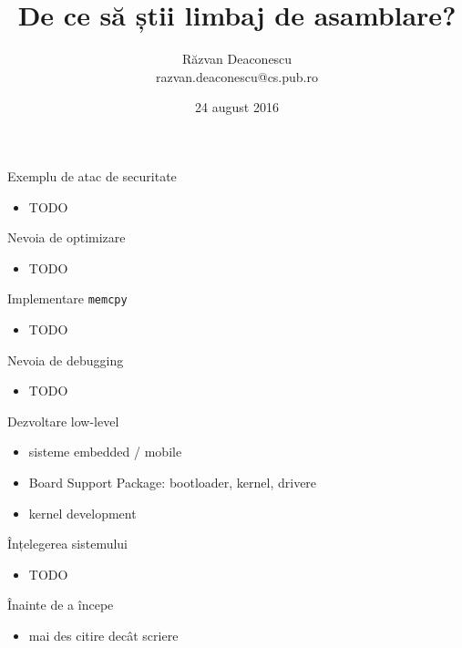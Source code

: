 \documentclass{beamer}
\title[De ce asm?]{De ce să știi limbaj de asamblare?}
\institute{Informatica la Castel 2016 (Macea, Arad)}
\author[Răzvan Deaconescu]{Răzvan Deaconescu \\
razvan.deaconescu@cs.pub.ro}
\date{24 august 2016}
\begin{document}
\frame{\titlepage}

\begin{frame}{Exemplu de atac de securitate}
  \begin{itemize}
    \item TODO
  \end{itemize}
\end{frame}

\begin{frame}{Nevoia de optimizare}
  \begin{itemize}
    \item TODO
  \end{itemize}
\end{frame}

\begin{frame}{Implementare \texttt{memcpy}}
  \begin{itemize}
    \item TODO
  \end{itemize}
\end{frame}

\begin{frame}{Nevoia de debugging}
  \begin{itemize}
    \item TODO
  \end{itemize}
\end{frame}

\begin{frame}{Dezvoltare low-level}
  \begin{itemize}
    \pause \item sisteme embedded / mobile
    \pause \item Board Support Package: bootloader, kernel, drivere
    \pause \item kernel development
  \end{itemize}
\end{frame}

\begin{frame}{Înțelegerea sistemului}
  \begin{itemize}
    \item TODO
  \end{itemize}
\end{frame}

\begin{frame}{Înainte de a începe}
  \begin{itemize}
    \item mai des citire decât scriere
  \end{itemize}
\end{frame}
\end{document}
